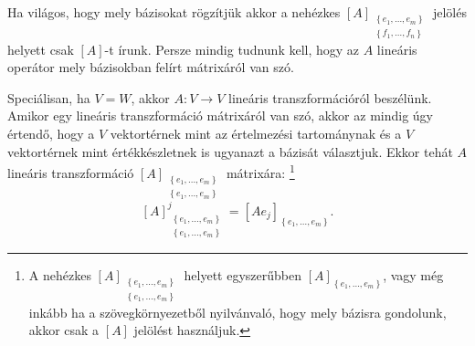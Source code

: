 \documentclass[a4paper, showtrims]{memoir}
\theoremstyle{plain}
\theoremstyle{remark}
\theoremstyle{definition}
\begin{document}
	Ha világos, hogy mely bázisokat rögzítjük akkor a nehézkes
		$[A]_{\substack{\left\{ e_1,\ldots,e_m \right\}\\ \left\{ f_1,\ldots,f_n \right\}}}$
		jelölés helyett csak $[A]$-t írunk.
		Persze mindig tudnunk kell, hogy az $A$ lineáris operátor mely bázisokban felírt mátrixáról van szó.

Speciálisan, ha $V=W$, akkor $A:V\to V$ lineáris transzformációról beszélünk.
Amikor egy lineáris transzformáció mátrixáról van szó,
akkor az mindig úgy értendő, hogy a $V$ vektortérnek mint az értelmezési tartománynak és a
$V$ vektortérnek mint értékkészletnek is ugyanazt a bázisát választjuk.
Ekkor tehát $A$ lineáris transzformáció
$[A]_{\substack{\left\{ e_1,\ldots,e_m \right\}\\ \left\{ e_1,\ldots,e_m \right\}}}$
mátrixára:
\footnote{
	A nehézkes
	$[A]_{\substack{\left\{ e_1,\ldots,e_m \right\}\\ \left\{ e_1,\ldots,e_m \right\}}}$
	helyett egyszerűbben
	$[A]_{\left\{ e_1,\ldots,e_m \right\}}$, vagy még inkább ha a szövegkörnyezetből nyilvánvaló, hogy mely bázisra gondolunk,
	akkor csak a $[A]$ jelölést használjuk.
}
\[
	[A]_{\substack{\left\{ e_1,\ldots,e_m \right\}\\ \left\{ e_1,\ldots,e_m \right\}}}^j
	=
	\left[ Ae_j \right]_{\left\{ e_1,\ldots,e_m \right\}}.
\]
\end{document}
